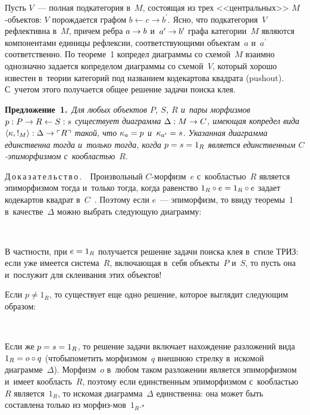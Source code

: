 \begin{multicols}{2}
   Пусть $V$~--- полная подкатегория в~$M$, состоящая из трех 
<<центральных>> $M$-объ\-ек\-тов: $V$ порождается графом $b\leftarrow 
c\rightarrow b^\prime$. Ясно, что подкатегория~$V$ рефлективна в~$M$, 
причем ребра $a\hm\to b$ и~$a^\prime\hm\to b^\prime$ графа категории~$M$ 
являются компонентами единицы рефлексии, соответствующими объектам~$a$ 
и~$a^\prime$ соответственно. По теореме~1 копредел диаграммы со 
схемой~$M$ взаимно однозначно задается копределом диаграммы со 
схемой~$V$, который хорошо известен в~теории категорий под названием 
кодекартова квадрата (pushout). С~учетом этого получается общее решение 
задачи поиска клея.
   
   \smallskip
   
   \noindent
   \textbf{Предложение~1.}\ \textit{Для любых объектов $P$, $S$, $R$ и~пары 
морфизмов $p : P \hm\to R \hm\leftarrow S : s$ существует диаграмма $\Delta : M 
\hm\to C$, имеющая копредел вида $\langle \kappa, !_M\rangle : \Delta\hm\to 
\ulcorner R\urcorner$ такой, что $\kappa_a\hm= p$ и~$\kappa_{a^\prime}\hm = s$. 
Указанная диаграмма единственна тогда и~только тогда, когда $p \hm= s \hm= 
1_R$ является единственным $C$-эпи\-мор\-физ\-мом с~кообластью}~$R$.
   
   \smallskip
   
   \noindent
   Д\,о\,к\,а\,з\,а\,т\,е\,л\,ь\,с\,т\,в\,о\,.\ \
   Произвольный $C$-мор\-физм~$e$ с~кообластью~$R$ является 
эпиморфизмом тогда и~только тогда, когда равенство $1_R \circ e \hm= 1_R \circ 
e$ задает кодекартов квадрат в~$C$~\cite[упражнение~3.4.4]{16-kov}. Поэтому 
если $e$~--- эпиморфизм, то ввиду теоремы~1 в~качестве~$\Delta$ можно 
выбрать следующую диаграмму:
\begin{center} %
\vspace*{1pt}
 \mbox{%
 \epsfxsize=36.995mm 
 }
\end{center}

В частности, при $e\hm = 1_R$ получается решение задачи поиска клея в~стиле 
ТРИЗ: если уже имеется сис\-те\-ма~$R$, включающая в~себя объекты~$P$ и~$S$, 
то пусть она и~послужит для склеивания этих объектов!

   Если $p\not=  1_R$, то существует еще одно решение, которое выглядит 
следующим образом:
\begin{center} %
\vspace*{1pt}
 \mbox{%
 \epsfxsize=36.995mm 
 }
\end{center}

   Если же $p = s \hm= 1_R$, то решение задачи включает нахождение 
разложений вида $1_R \hm= o\circ q$ (чтобы\linebreak пометить морфизмом~$q$ 
внешнюю стрелку в~искомой
 диаграмме~$\Delta$). Морфизм~$o$ в~любом 
таком разложе\-нии является эпиморфизмом~\cite[предложение~7.42]{15-kov} 
и~имеет кообласть~$R$, поэтому если единственным эпиморфизмом 
с~кообластью~$R$ является~$1_R$, то искомая диаграмма~$\Delta$ 
единственна: она может быть составлена только из 
морфиз-\linebreak мов~$1_R$.\hfill$\square$
   

\end{multicols}
